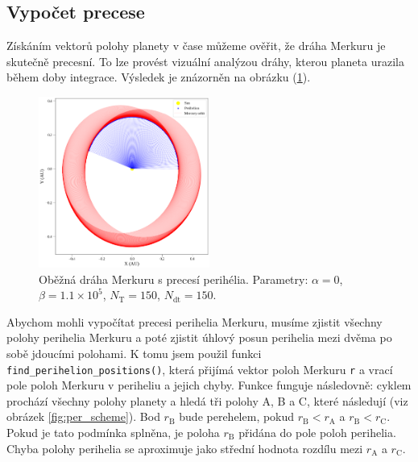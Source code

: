 \documentclass[a4paper,11pt,twocolumn]{article}
\begin{document}
        \subsection{Vypočet precese}
            Získáním vektorů polohy planety v čase můžeme ověřit, že dráha Merkuru je skutečně precesní. To lze provést vizuální analýzou dráhy, kterou planeta urazila během doby integrace. Výsledek je znázorněn na obrázku (\ref{fig:orbit}).

            \begin{figure}
                \centering
                \includegraphics[width=0.5\textwidth]{orbit_0_110000.0_150_150.png}
                \caption{Oběžná dráha Merkuru s precesí perihélia. Parametry: $\alpha = 0$, $\beta = 1.1 \times 10^5$, $N_{\text{T}} = 150$, $N_{\text{dt}} = 150$.}
                \label{fig:orbit}
            \end{figure}

            Abychom mohli vypočítat precesi perihelia Merkuru, musíme zjistit všechny polohy perihelia Merkuru a poté zjistit úhlový posun perihelia mezi dvěma po sobě jdoucími polohami. K tomu jsem použil funkci \texttt{find\_perihelion\_positions()}, která přijímá vektor poloh Merkuru \texttt{r} a vrací pole poloh Merkuru v periheliu a jejich chyby. Funkce funguje následovně: cyklem prochází všechny polohy planety a hledá tři polohy A, B a C, které následují (viz obrázek \ref{fig:per_scheme}). Bod $r_\text{B}$ bude perehelem, pokud $r_\text{B} < r_\text{A}$ a $r_\text{B} < r_\text{C}$. Pokud je tato podmínka splněna, je poloha $r_\text{B}$ přidána do pole poloh perihelia. Chyba polohy perihelia se aproximuje jako střední hodnota rozdílu mezi $r_\text{A}$ a $r_\text{C}$.
\end{document}

